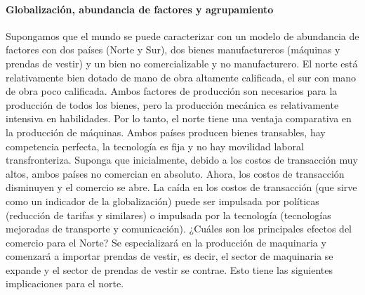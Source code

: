 \paragraph{Globalización, abundancia de factores y agrupamiento}
Supongamos que el mundo se puede caracterizar con un modelo de abundancia de factores con dos países (Norte y Sur), dos bienes manufactureros (máquinas y prendas de vestir) y un bien no comercializable y no manufacturero. El norte está relativamente bien dotado de mano de obra altamente calificada, el sur con mano de obra poco calificada. Ambos factores de producción son necesarios para la producción de todos los bienes, pero la producción mecánica es relativamente intensiva en habilidades. Por lo tanto, el norte tiene una ventaja comparativa en la producción de máquinas. Ambos países producen bienes transables, hay competencia perfecta, la tecnología es fija y no hay movilidad laboral transfronteriza. Suponga que inicialmente, debido a los costos de transacción muy altos, ambos países no comercian en absoluto. Ahora, los costos de transacción disminuyen y el comercio se abre. La caída en los costos de transacción (que sirve como un indicador de la globalización) puede ser impulsada por políticas (reducción de tarifas y similares) o impulsada por la tecnología (tecnologías mejoradas de transporte y comunicación). ¿Cuáles son los principales efectos del comercio para el Norte? Se especializará en la producción de maquinaria y comenzará a importar prendas de vestir, es decir, el sector de maquinaria se expande y el sector de prendas de vestir se contrae. Esto tiene las siguientes implicaciones para el norte.
